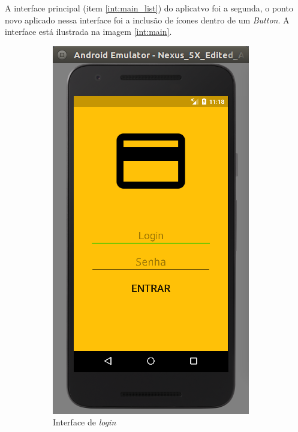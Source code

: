 \documentclass[hidelinks,12pt]{article}
\begin{document}
A interface principal (item \ref{int:main_list}) do aplicatvo foi a segunda, o ponto novo aplicado nessa interface foi a inclus\~ao de \'icones dentro de um \textit{Button}. A interface est\'a ilustrada na imagem \ref{int:main}.
\begin{figure}[H]
	\begin{subfigure}{0.5\textwidth}
		\includegraphics[scale=0.5]{int:login}
		\caption{Interface de \textit{login}\\\hspace{\textwidth}\\\hspace{\textwidth}}
		\label{int:login_img}
	\end{subfigure}
	\begin{subfigure}{0.5\textwidth}

\end{subfigure}
\end{figure}
\end{document}
